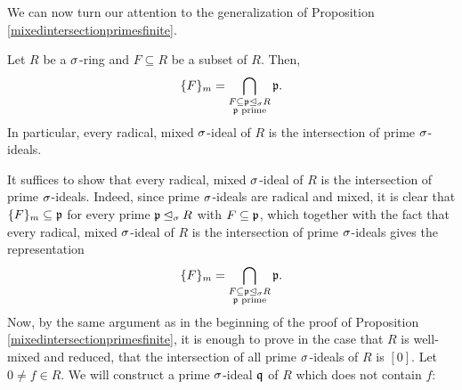 We can now turn our attention to the generalization of Proposition \ref{mixedintersectionprimesfinite}. 


\begin{theorem}\label{intersectionprimes}
Let $R$ be a $\sigma$-ring and $F \subseteq R$ be a subset of $R$. Then, 
\begin{align*} \{F\}_m = \bigcap_{\substack{F \subseteq \mathfrak{p} \unlhd_{\sigma} R \\ \mathfrak{p} \text{ prime}}} \mathfrak{p}. \end{align*}
In particular, every radical, mixed $\sigma$-ideal of $R$ is the intersection of prime $\sigma$-ideals.
\begin{bew}
It suffices to show that every radical, mixed $\sigma$-ideal of $R$ is the intersection of prime $\sigma$-ideals.
Indeed, since prime $\sigma$-ideals are radical and mixed, it is clear that $\{F\}_m \subseteq \mathfrak{p}$ for every prime $\mathfrak{p} \unlhd_{\sigma} R$ with $F \subseteq \mathfrak{p}$, which together with the fact that every radical, mixed $\sigma$-ideal of $R$ is the intersection of prime $\sigma$-ideals gives the representation 
\begin{align*} \{F\}_m = \bigcap_{\substack{F \subseteq \mathfrak{p} \unlhd_{\sigma} R \\ \mathfrak{p} \text{ prime}}} \mathfrak{p}. \end{align*}
Now, by the same argument as in the beginning of the proof of Proposition \ref{mixedintersectionprimesfinite}, it is enough to prove in the case that $R$ is well-mixed and reduced, that the intersection of all prime $\sigma$-ideals of $R$ is $[0]$.
Let $0 \neq f \in R$. We will construct a prime $\sigma$-ideal $\mathfrak{q}$ of $R$ which does not contain $f$: 


\end{bew}
\end{theorem}
